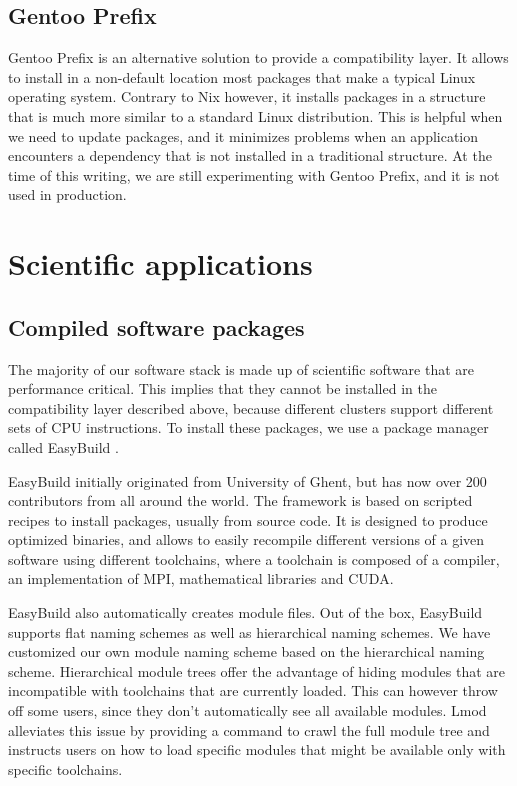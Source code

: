 \documentclass[sigconf]{acmart}
\begin{document}
\subsection{Gentoo Prefix}
\label{sub:Gentoo_Prefix}
Gentoo Prefix \cite{Gentoo} is an alternative solution to provide a compatibility layer. It allows to install in a non-default location most packages that make a typical Linux operating system. Contrary to Nix however, it installs packages in a structure that is much more similar to a standard Linux distribution. This is helpful when we need to update packages, and it minimizes problems when an application encounters a dependency that is not installed in a traditional structure. At the time of this writing, we are still experimenting with Gentoo Prefix, and it is not used in production. 

\section{Scientific applications}
\label{sec:Scientific_applications}

\subsection{Compiled software packages}
\label{sub:Compiled_software_packages}
The majority of our software stack is made up of scientific software that are performance critical. This implies that
they cannot be installed in the compatibility layer described above, because different clusters support different sets
of CPU instructions. To install these packages, we use a package manager called EasyBuild
\cite{EasyBuild2012,EasyBuild2014,EasyBuild2016}.

EasyBuild initially originated from University of Ghent, but has now over 200 contributors from all around the world.
The framework is based on scripted recipes to install packages, usually from source code. It is designed to produce
optimized binaries, and allows to easily recompile different versions of a given software using different toolchains,
where a toolchain is composed of a compiler, an implementation of MPI, mathematical libraries and CUDA.

EasyBuild also automatically creates module files. Out of the box, EasyBuild supports flat naming schemes as well as
hierarchical naming schemes. We have customized our own module naming scheme based on the hierarchical naming scheme.
Hierarchical module trees offer the advantage of hiding modules that are incompatible with toolchains that are
currently loaded. This can however throw off some users, since they don’t automatically see all available modules. Lmod
\cite{Lmod} alleviates this issue by providing a command to crawl the full module tree and instructs users on how to
load specific modules that might be available only with specific toolchains.
\end{document}
